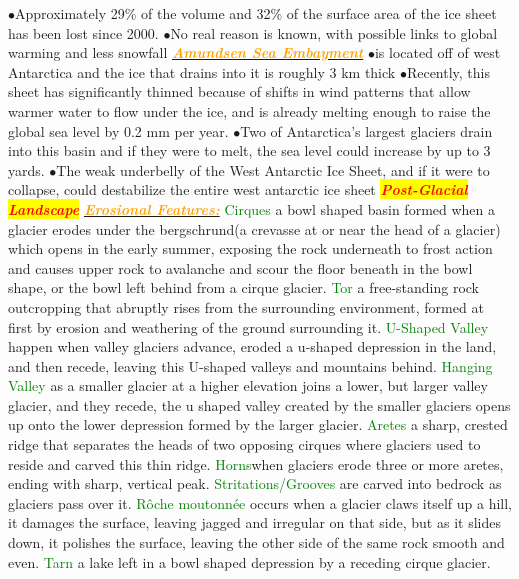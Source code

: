\documentclass{article}
\newcommand{\ddd}{$\bullet$}
\newcommand{\red}[1]{\textcolor{red}{#1}}
\newcommand{\green}[1]{\textcolor{green}{#1}}
\newcommand{\orange}[1]{\textcolor{orange}{#1}}
\newcommand{\mysection}[1]{\colorbox{yellow}{\textbf{\textit{\red{#1}}}}}
\newcommand{\mysub}[1]{\underline{\textbf{{\textit{\orange{#1}}}}}}
\newcommand{\mysubsub}[1]{{{\green{#1}}}}
\begin{document}
\begin{multicols*}{4}
                \ddd Approximately 29\% of the volume and 32\% of the surface area of the ice sheet has been lost since 2000.
                \ddd No real reason is known, with possible links to global warming and less snowfall
            \mysub{Amundsen Sea Embayment}
                \ddd is located off of west Antarctica and the ice that drains into it is roughly 3 km thick
                \ddd Recently, this sheet has significantly thinned because of shifts in wind patterns that allow warmer water to flow under the ice, and is already melting enough to raise the global sea level by 0.2 mm per year. 
                \ddd Two of Antarctica's largest glaciers drain into this basin and if they were to melt, the sea level could increase by up to 3 yards. 
                \ddd The weak underbelly of the West Antarctic Ice Sheet, and if it were to collapse, could destabilize the entire west antarctic ice sheet
 	    \mysection{Post-Glacial Landscape}  
	 	    \mysub{Erosional Features:}
	 	    \mysubsub{Cirques} a bowl shaped basin formed when a glacier erodes under the bergschrund(a crevasse at or near the head of a glacier) which opens in the early summer, exposing the rock underneath to frost action and causes upper rock to avalanche and scour the floor beneath in the bowl shape, or the bowl left behind from a cirque glacier.
	 	    \mysubsub{Tor} a free-standing rock outcropping that abruptly rises from the surrounding environment, formed at first by erosion and weathering of the ground surrounding it.
	 	    \mysubsub{U-Shaped Valley} happen when valley glaciers advance, eroded a u-shaped depression in the land, and then recede, leaving this U-shaped valleys and mountains behind.
	 	    \mysubsub{Hanging Valley} as a smaller glacier at a higher elevation joins a lower, but larger valley glacier, and they recede, the u shaped valley created by the smaller glaciers opens up onto the lower depression formed by the larger glacier.
	 	    \mysubsub{Aretes} a sharp, crested ridge that separates the heads of two opposing cirques where glaciers used to reside and carved this thin ridge.
	 	    \mysubsub{Horns}when glaciers erode three or more aretes, ending with sharp, vertical peak.
	 	    \mysubsub{Stritations/Grooves} are carved into bedrock as glaciers pass over it.
	 	    \mysubsub{Rôche moutonnée} occurs when a glacier claws itself up a hill, it damages the surface, leaving jagged and irregular on that side, but as it slides down, it polishes the surface, leaving the other side of the same rock smooth and even.
	 	    \mysubsub{Tarn} a lake left in a bowl shaped depression by a receding cirque glacier.

\end{multicols*}
\end{document}
